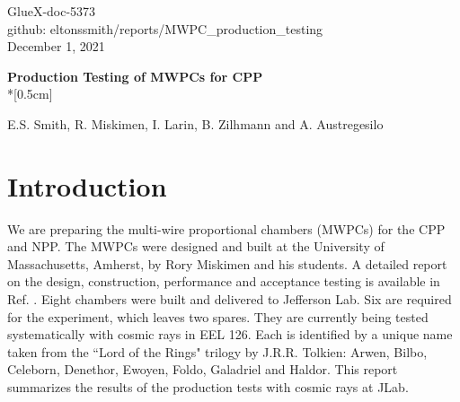 \documentclass[12pt]{article}
\begin{document}
\begin{flushright}
GlueX-doc-5373\\
github: eltonssmith/reports/MWPC\_production\_testing\\
December 1, 2021
\end{flushright}




\begin{center}
{\Large \bf Production Testing of MWPCs for CPP}\\*[0.5cm]
\end{center}

\begin{center}   
{\sc  E.S. Smith, R. Miskimen, I. Larin, B. Zilhmann and A. Austregesilo}\\  
\end{center}


\section{Introduction}
We are preparing the multi-wire proportional chambers (MWPCs) for the CPP\cite{CPPexp} and NPP\cite{NPPexp}. The MWPCs were designed and built at the University of Massachusetts, Amherst, by Rory Miskimen and his students. A detailed report on the design, construction, performance and acceptance testing is available in Ref. \cite{hdnote5080}. Eight chambers were built and delivered to Jefferson Lab. Six are required for the experiment, which leaves two spares. They are currently being tested systematically with cosmic rays in EEL 126. Each is identified by a unique name taken from the ``Lord of the Rings" trilogy by J.R.R. Tolkien: Arwen, Bilbo, Celeborn, Denethor, Ewoyen, Foldo, Galadriel and Haldor. This report summarizes the results of the production tests with cosmic rays at JLab.
\end{document}
